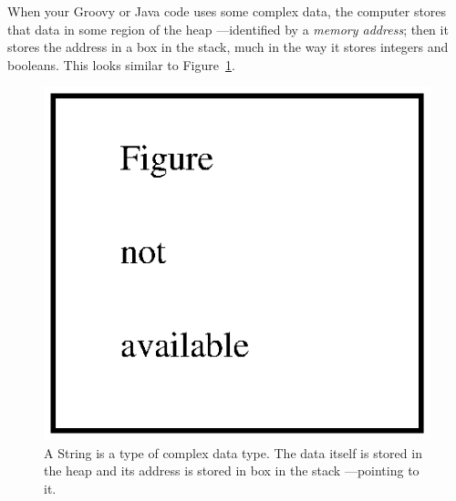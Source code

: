 When your Groovy or Java code uses some complex data, the computer
stores that data in some region of the heap ---identified by a \emph{memory
  address}; then it stores the address in a box in the stack, much in
the way it stores integers and booleans. This looks similar to
Figure~\ref{fig:compledata}. 

\begin{figure}[htbp]
  \centering
  \includegraphics[width=\textwidth]{gfx/no_figure}
  \caption{A String is a type of complex data type. The data itself is stored in the heap and its address is stored in box in the stack ---pointing to it.}
  \label{fig:compledata}
\end{figure}






